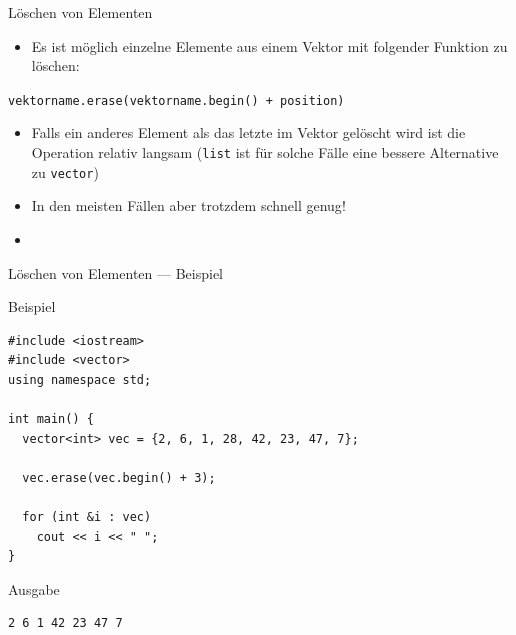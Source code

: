 \documentclass[presentation]{beamer}
\begin{document}
\begin{frame}[fragile,label={sec:org3f91e66}]{Löschen von Elementen}
 \begin{itemize}
\item Es ist möglich \alert{einzelne Elemente} aus einem Vektor mit folgender
Funktion zu \alert{löschen}:
\end{itemize}
{\color{solarizedYellow}\texttt{vektorname.erase(vektorname.begin() + position)}}
\begin{itemize}
\item Falls ein anderes Element als das letzte im Vektor gelöscht wird ist
die Operation \alert{relativ langsam} ({\color{solarizedYellow}\texttt{list} }ist für solche Fälle eine
bessere Alternative zu {\color{solarizedYellow}\texttt{vector}})
\item In den meisten Fällen aber trotzdem \alert{schnell genug}!

\item 
\end{itemize}
\end{frame}

\begin{frame}[fragile,label={sec:org017091e}]{Löschen von Elementen --- Beispiel}
 \begin{block}{Beispiel}
\begin{verbatim}
#include <iostream>
#include <vector>
using namespace std;

int main() {
  vector<int> vec = {2, 6, 1, 28, 42, 23, 47, 7};

  vec.erase(vec.begin() + 3);

  for (int &i : vec)
    cout << i << " ";
}
\end{verbatim}
\end{block}

\begin{block}{Ausgabe}
\begin{verbatim}
2 6 1 42 23 47 7
\end{verbatim}
\end{block}
\end{frame}
\end{document}
